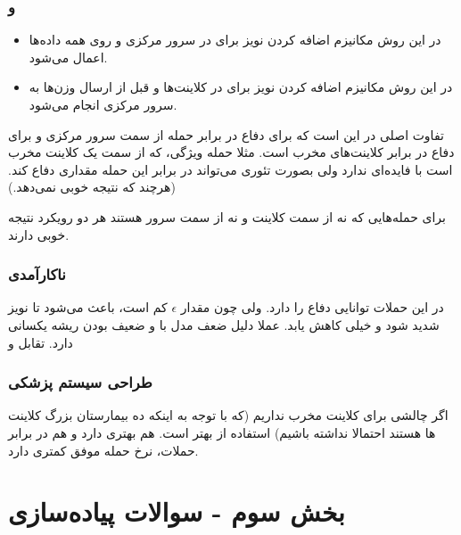 \subsubsection{ و }
\begin{itemize}
	\item 
	\textbf{}
	در این روش مکانیزم اضافه کردن نویز برای 
	در سرور مرکزی و روی همه داده‌ها اعمال می‌شود. 
	\item 
	\textbf{}
	در این روش مکانیزم اضافه کردن نویز برای 
	در کلاینت‌ها و قبل از ارسال وزن‌ها به سرور مرکزی انجام می‌شود.
\end{itemize}

تفاوت اصلی در این است که 
برای دفاع در برابر حمله از سمت سرور مرکزی و 
برای دفاع در برابر کلاینت‌های مخرب است.  مثلا حمله ویژگی، که از سمت یک کلاینت مخرب است با 
فایده‌ای ندارد ولی 
بصورت تئوری می‌تواند در برابر این حمله مقداری دفاع کند. (هرچند که نتیجه خوبی نمی‌دهد.)

برای حمله‌هایی که نه از سمت کلاینت و نه از سمت سرور هستند هر دو رویکرد نتیجه خوبی دارند. 

\subsubsection{ناکارآمدی }
در این حملات 
توانایی دفاع را دارد. ولی چون مقدار
$\epsilon$
کم است، باعث می‌شود تا نویز شدید شود و 
خیلی کاهش یابد. عملا دلیل ضعف مدل با 
و ضعیف بودن 
ریشه یکسانی دارد. تقابل 
و

\subsubsection{طراحی سیستم پزشکی}
اگر چالشی برای کلاینت مخرب نداریم (که با توجه به اینکه ده بیمارستان بزرگ کلاینت ها هستند احتمالا نداشته باشیم) استفاده از 
بهتر است. 
هم 
بهتری دارد و هم در برابر حملات، نرخ حمله موفق کمتری دارد.

\section{بخش سوم - سوالات پیاده‌سازی}











































